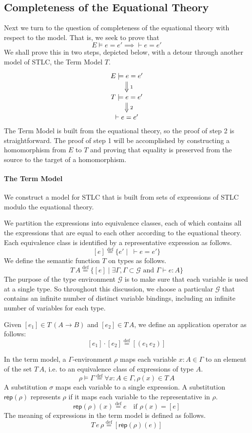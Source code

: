\documentclass{tufte-handout}
\newcommand{\defeq}[0]{\overset{\mathrm{def}}{=}}
\newcommand{\APP}[0]{\,}
\begin{document}
\subsection{Completeness of the Equational Theory}

Next we turn to the question of completeness of the equational theory
with respect to the model. That is, we seek to prove that
\[
    E \models e = e' \implies \vdash e = e'
\]
We shall prove this in two steps, depicted below, with a detour
through another model of STLC, the Term Model $T$.
\[
\xymatrix@=15pt{
  E \models e = e' \ar@{=>}[d]^{\;1} \\
  T \models e = e' \ar@{=>}[d]^{\;2} \\
  \vdash e = e'
}
\]
The Term Model is built from the equational theory, so the proof of
step 2 is straightforward. The proof of step 1 will be accomplished by
constructing a homomorphism from $E$ to $T$ and proving that equality
is preserved from the source to the target of a homomorphism.

\paragraph{The Term Model}

We construct a model for STLC that is built from sets of expressions
of STLC modulo the equational theory.

We partition the expressions into equivalence classes, each of which
contains all the expressions that are equal to each other according to
the equational theory. Each equivalence class is identified by a
representative expression as follows.
\[
  [e] \defeq \{ e' \mid \; \vdash e = e' \}
\]
We define the semantic function $T$ on types as follows.
\[
T\,A \defeq \{ [e] \mid \exists \Gamma, \Gamma \subset \mathcal{G}
  \text{ and } \Gamma \vdash e : A \}
\]
The purpose of the type environment $\mathcal{G}$ is to make sure that
each variable is used at a single type. So throughout this discussion,
we choose a particular $\mathcal{G}$ that contains an infinite number
of distinct variable bindings, including an infinite number of
variables for each type.

Given $[e_1] \in T\,(A\to B)$ and $[e_2] \in T\,A$, we define an
application operator as follows:
\[
    [e_1] \cdot [e_2] \defeq [(e_1\APP e_2)]
\]

In the term model, a $\Gamma$-environment $\rho$ maps each variable $x
: A \in \Gamma$ to an element of the set $T\,A$, i.e. to an
equivalence class of expressions of type $A$.
\[
  \rho \models \Gamma \defeq \forall x:A \in \Gamma, \rho(x) \in T\,A
\]
A substitution $\sigma$ maps each variable to a single expression. A
substitution $\mathsf{rep}(\rho)$ represents $\rho$ if it maps each
variable to the representative in $\rho$.
\[
  \mathsf{rep}(\rho)(x) \defeq e \quad \text{if } \rho(x) = [e]
\]
The meaning of expressions in the term model is defined as follows.
\[
  T\,e\,\rho \defeq [\mathsf{rep}(\rho)(e)]
\]
\end{document}
